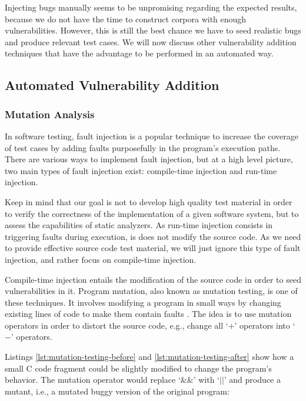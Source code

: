 Injecting bugs manually seems to be unpromising regarding the expected results, because we do not have the time to construct corpora with enough vulnerabilities. However, this is still the best chance we have to seed realistic bugs and produce relevant test cases. We will now discuss other vulnerability addition techniques that have the advantage to be performed in an automated way.

\subsection{Automated Vulnerability Addition}

\subsubsection{Mutation Analysis}

In software testing, fault injection is a popular technique to increase the coverage of test cases by adding faults purposefully in the program's execution paths. There are various ways to implement fault injection, but at a high level picture, two main types of fault injection exist: compile-time injection and run-time injection.

Keep in mind that our goal is not to develop high quality test material in order to verify the correctness of the implementation of a given software system, but to assess the capabilities of static analyzers. As run-time injection consists in triggering faults during execution, is does not modify the source code. As we need to provide effective source code test material, we will just ignore this type of fault injection, and rather focus on compile-time injection.

Compile-time injection entails the modification of the source code in order to seed vulnerabilities in it. Program mutation, also known as mutation testing, is one of these techniques. It involves modifying a program in small ways by changing existing lines of code to make them contain faults \cite{wikipedia2016mutation,wikipedia2016fault}. The idea is to use mutation operators in order to distort the source code, e.g., change all `$+$' operators into `$-$' operators.

Listings \ref{lst:mutation-testing-before} and \ref{lst:mutation-testing-after} show how a small C code fragment could be slightly modified to change the program's behavior. The mutation operator would replace `$\&\&$' with `$||$' and produce a \gls{mutant}, i.e., a mutated buggy version of the original program:


